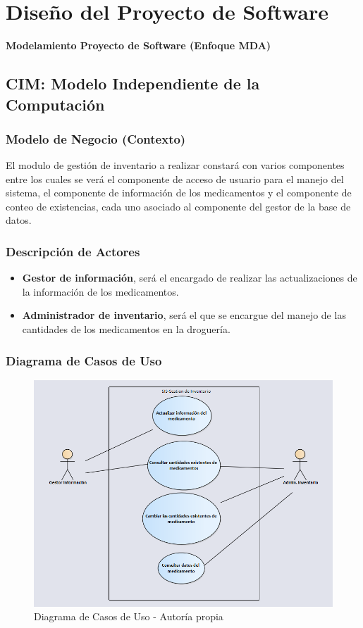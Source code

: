\chapter{Diseño del Proyecto de Software}
\large{\textbf{Modelamiento Proyecto de Software (Enfoque MDA)}}
\section{CIM: Modelo Independiente de la Computaci\'on}
\subsection{Modelo de Negocio (Contexto)}
El modulo de gesti\'on de inventario a realizar constar\'a con varios componentes
entre los cuales se ver\'a el componente de acceso de usuario para el manejo del
sistema, el componente de informaci\'on de los medicamentos y el componente de
conteo de existencias, cada uno asociado al componente del gestor de la base de datos.
\newpage
\subsection{Descripción de Actores}
\begin{itemize}
\item \textbf{Gestor de informaci\'on}, ser\'a el encargado de realizar las actualizaciones de la informaci\'on de los medicamentos.
    \item \textbf{Administrador de inventario}, ser\'a el que se encargue del manejo de las cantidades de los medicamentos en la droguer\'ia.
\end{itemize}
\subsection{Diagrama de Casos de Uso}
\begin{center}
\begin{figure}[htb]
\centering
\includegraphics[width = 1.0\textwidth]{libro/capitulo5/img/CasosUso.PNG}
\caption{Diagrama de Casos de Uso - Autor\'ia propia}
\end{figure}
\end{center}
